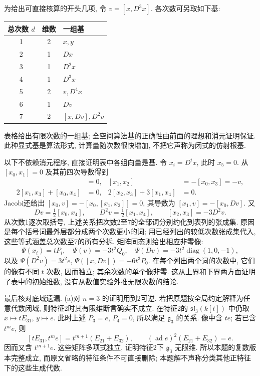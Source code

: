 \begin{solution}
为给出可直接核算的开头几项, 令 $v=[x,D^3x]$. 各次数可另取如下基:
\begin{center}
\begin{tabular}{ccl}
\toprule
总次数 $d$ & 维数 & 一组基\\
\midrule
1&2&$x,y$\\
2&1&$Dx$\\
3&1&$D^2x$\\
4&1&$D^3x$\\
5&2&$v,D^4x$\\
6&1&$Dv$\\
7&2&$[x,Dv],D^2v$\\
\bottomrule
\end{tabular}
\end{center}
表格给出有限次数的一组基; 全空间算法基的正确性由前面的理想和消元证明保证. 此种显式基是算法形式, 计算量随次数很快增加, 不把它声称为闭式的仿射根基.

以下不依赖消元程序, 直接证明表中各组向量是基. 令 $x_i=D^ix$, 此时 $x_5=0$. 从 $[x_0,x_1]=0$ 及其前四次导数得到
\begin{align*}
[x_0,x_2]&=0,&[x_1,x_2]&=-[x_0,x_3]=-v,\\
2[x_1,x_3]+[x_0,x_4]&=0,&
2[x_2,x_3]+3[x_1,x_4]&=0.
\end{align*}
Jacobi还给出 $[x_0,v]=-[x_0,[x_1,x_2]]=0$, 其导数为 $[x_1,v]=-[x_0,Dv]$. 又
\[
Dv=\tfrac12[x_0,x_4],\qquad
D^2v=\tfrac12[x_1,x_4],\qquad [x_2,x_3]=-3D^2v.
\]
从次数1逐次取括号, 上述关系把次数2至7的全部词分别约化到表列的张成集. 原因是每个括号词最外层都分成两个次数更小的词; 用已经列出的较低次数张成集代入, 这些等式涵盖总次数至7的所有分拆. 矩阵同态则给出相应非零像:
\[
\Psi(x_i)=tP_i,\quad
\Psi(v)=-3t^2Q_0,\quad
\Psi(Dv)=-3t^2\operatorname{diag}(1,0,-1),
\]
以及 $\Psi(D^2v)=3t^2e$, $\Psi([x,Dv])=-6t^3P_0$. 在每个列出两个词的次数中, 它们的像有不同 $t$ 次数, 因而独立; 其余次数的单个像非零. 这从上界和下界两方面证明了表中的初始维数, 没有从数值实验外推无限次数的结论.

最后核对底域遗漏. (a)对 $n=3$ 的证明用到2可逆. 若把原题按全局约定解释为任意代数闭域, 则特征2时其有限维断言确实不成立. 在特征2的 $\mathfrak{sl}_3(k[t])$ 中仍取 $x\mapsto tE_{31}$, $y\mapsto e$. 此时上述 $P_3=e$, $P_4=0$, 所以满足 $\mathfrak g_3$ 的关系. 像中含 $te$; 若已含 $t^m e$, 则
\[
[tE_{31},t^me]=t^{m+1}(E_{21}+E_{32}),\qquad
(\operatorname{ad}e)^2(E_{21}+E_{32})=e.
\]
因而又含 $t^{m+1}e$. 这些矩阵多项式独立, 证明特征2下 $\mathfrak g_3$ 无限维. 所以本题的复数版本完整成立, 而原文省略的特征条件不可直接删除; 本题解不声称分类其他正特征下的这些生成代数.
\end{solution}
